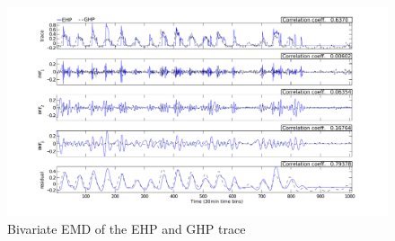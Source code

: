 
\begin{figure}[tb]
\hspace{-2cm}
\includegraphics[width=1.2\textwidth]{img/emd_25_41-eps-converted-to}
\vspace{-1cm}
\caption{Bivariate EMD of the EHP and GHP trace}
\label{fig:emd2}
\end{figure}







